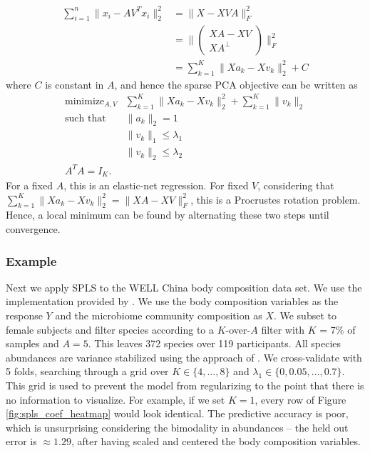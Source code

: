 \documentclass{article}
\begin{document}
\begin{align*}
  \sum_{i = 1}^{n} \|x_i - AV^T x_i\|_2^2 &= \|X - XVA\|_{F}^2 \\
  &= \|\begin{pmatrix} XA - XV \\ XA^{\perp} \end{pmatrix} \|_{F}^2 \\
  &= \sum_{k = 1}^{K} \|Xa_k - X v_k\|_2^2 + C
\end{align*}
where $C$ is constant in $A$, and hence the sparse PCA objective can be written
as
\begin{align*}
  \text{minimize}_{A, V} &\sum_{k = 1}^{K} \|Xa_k - X v_k\|_2^2 + \sum_{k = 1}^{K} \|v_k\|_2 \\
  \text{such that }&\|a_k\|_2 = 1 \\
  & \|v_k\|_1 \leq \lambda_1 \\
  & \|v_k\|_2 \leq \lambda_2 \\
  A^TA = I_K.
\end{align*}
For a fixed $A$, this is an elastic-net regression. For fixed $V$, considering
that $\sum_{k = 1}^{K} \|Xa_k - Xv_k\|^2_2 = \|XA - XV\|_F^2$, this is a
Procrustes rotation problem. Hence, a local minimum can be found by alternating
these two steps until convergence.

\subsubsection{Example}
\label{subsubsec:spls_example}

Next we apply SPLS to the WELL China body composition data set. We use the
implementation provided by \cite{chung2012spls}. We use the body composition
variables as the response $Y$ and the microbiome community composition as $X$.
We subset to female subjects and filter species according to a $K$-over-$A$
filter with $K$ = 7\% of samples and $A = 5$. This leaves 372 species over 119
participants. All species abundances are variance stabilized using the approach
of \cite{anders2010differential}. We cross-validate with 5 folds, searching
through a grid over $K \in \{4, \dots, 8\}$ and $\lambda_1 \in \{0, 0.05, \dots,
0.7\}$. This grid is used to prevent the model from regularizing to the point
that there is no information to visualize. For example, if we set $K = 1$, every
row of Figure \ref{fig:spls_coef_heatmap} would look identical. The predictive
accuracy is poor, which is unsurprising considering the bimodality in abundances
-- the held out error is $\approx 1.29$, after having scaled and centered the
body composition variables.
\end{document}
